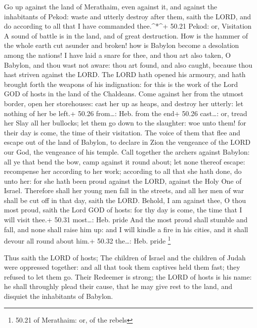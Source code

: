  Go up against the land of Merathaim, even against it, and
against the inhabitants of Pekod: waste and utterly destroy after them,
saith the LORD, and do according to all that I have commanded
thee.\^{}*\^{}+ 50.21 Pekod: or, Visitation  A sound of
battle is in the land, and of great destruction.  How is
the hammer of the whole earth cut asunder and broken! how is Babylon
become a desolation among the nations!  I have laid a snare
for thee, and thou art also taken, O Babylon, and thou wast not aware:
thou art found, and also caught, because thou hast striven against the
LORD.  The LORD hath opened his armoury, and hath brought
forth the weapons of his indignation: for this is the work of the Lord
GOD of hosts in the land of the Chaldeans.  Come against
her from the utmost border, open her storehouses: cast her up as heaps,
and destroy her utterly: let nothing of her be left.+ 50.26 from\ldots:
Heb. from the end+ 50.26 cast\ldots: or, tread her  Slay
all her bullocks; let them go down to the slaughter: woe unto them! for
their day is come, the time of their visitation.  The voice
of them that flee and escape out of the land of Babylon, to declare in
Zion the vengeance of the LORD our God, the vengeance of his temple.
 Call together the archers against Babylon: all ye that
bend the bow, camp against it round about; let none thereof escape:
recompense her according to her work; according to all that she hath
done, do unto her: for she hath been proud against the LORD, against the
Holy One of Israel.  Therefore shall her young men fall in
the streets, and all her men of war shall be cut off in that day, saith
the LORD.  Behold, I am against thee, O thou most proud,
saith the Lord GOD of hosts: for thy day is come, the time that I will
visit thee.+ 50.31 most\ldots: Heb. pride  And the most
proud shall stumble and fall, and none shall raise him up: and I will
kindle a fire in his cities, and it shall devour all round about him.+
50.32 the\ldots: Heb. pride \footnote{50.21 of Merathaim: or, of the
  rebels}

 Thus saith the LORD of hosts; The children of Israel and
the children of Judah were oppressed together: and all that took them
captives held them fast; they refused to let them go. 
Their Redeemer is strong; the LORD of hosts is his name: he shall
throughly plead their cause, that he may give rest to the land, and
disquiet the inhabitants of Babylon.

